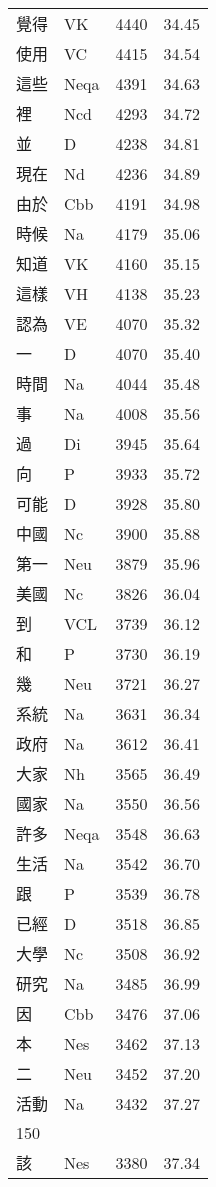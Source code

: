 \documentclass[twocolumn]{book}
\begin{document}
\begin{supertabular}{llrr}
覺得 & VK & 4440 &  34.45\\
使用 & VC & 4415 &  34.54\\
這些 & Neqa & 4391 &  34.63\\
裡 & Ncd & 4293 &  34.72\\
並 & D & 4238 &  34.81\\
現在 & Nd & 4236 &  34.89\\
由於 & Cbb & 4191 &  34.98\\
時候 & Na & 4179 &  35.06\\
知道 & VK & 4160 &  35.15\\
這樣 & VH & 4138 &  35.23\\
認為 & VE & 4070 &  35.32\\
一 & D & 4070 &  35.40\\
時間 & Na & 4044 &  35.48\\
事 & Na & 4008 &  35.56\\
過 & Di & 3945 &  35.64\\
向 & P & 3933 &  35.72\\
可能 & D & 3928 &  35.80\\
中國 & Nc & 3900 &  35.88\\
第一 & Neu & 3879 &  35.96\\
美國 & Nc & 3826 &  36.04\\
到 & VCL & 3739 &  36.12\\
和 & P & 3730 &  36.19\\
幾 & Neu & 3721 &  36.27\\
系統 & Na & 3631 &  36.34\\
政府 & Na & 3612 &  36.41\\
大家 & Nh & 3565 &  36.49\\
國家 & Na & 3550 &  36.56\\
許多 & Neqa & 3548 &  36.63\\
生活 & Na & 3542 &  36.70\\
跟 & P & 3539 &  36.78\\
已經 & D & 3518 &  36.85\\
大學 & Nc & 3508 &  36.92\\
研究 & Na & 3485 &  36.99\\
因 & Cbb & 3476 &  37.06\\
本 & Nes & 3462 &  37.13\\
二 & Neu & 3452 &  37.20\\
活動 & Na & 3432 &  37.27\\
150\\
該 & Nes & 3380 &  37.34\\

\end{supertabular}
\end{document}
